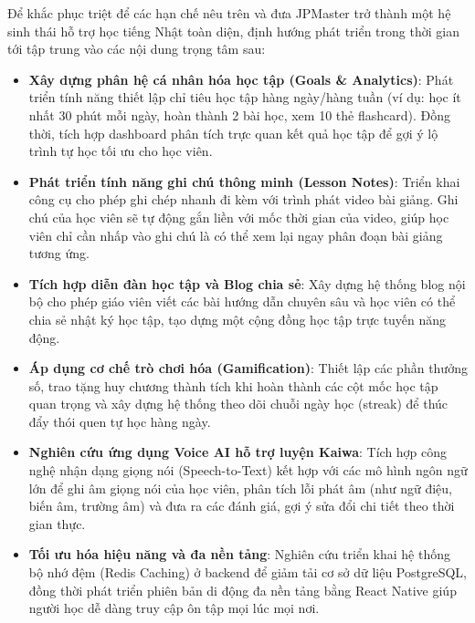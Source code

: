\documentclass[../DoAn.tex]{subfiles}
\begin{document}
Để khắc phục triệt để các hạn chế nêu trên và đưa JPMaster trở thành một hệ sinh thái hỗ trợ học tiếng Nhật toàn diện, định hướng phát triển trong thời gian tới tập trung vào các nội dung trọng tâm sau:
\begin{itemize}
    \item \textbf{Xây dựng phân hệ cá nhân hóa học tập (Goals \& Analytics)}: Phát triển tính năng thiết lập chỉ tiêu học tập hàng ngày/hàng tuần (ví dụ: học ít nhất 30 phút mỗi ngày, hoàn thành 2 bài học, xem 10 thẻ flashcard). Đồng thời, tích hợp dashboard phân tích trực quan kết quả học tập để gợi ý lộ trình tự học tối ưu cho học viên.
    \item \textbf{Phát triển tính năng ghi chú thông minh (Lesson Notes)}: Triển khai công cụ cho phép ghi chép nhanh đi kèm với trình phát video bài giảng. Ghi chú của học viên sẽ tự động gắn liền với mốc thời gian của video, giúp học viên chỉ cần nhấp vào ghi chú là có thể xem lại ngay phân đoạn bài giảng tương ứng.
    \item \textbf{Tích hợp diễn đàn học tập và Blog chia sẻ}: Xây dựng hệ thống blog nội bộ cho phép giáo viên viết các bài hướng dẫn chuyên sâu và học viên có thể chia sẻ nhật ký học tập, tạo dựng một cộng đồng học tập trực tuyến năng động.
    \item \textbf{Áp dụng cơ chế trò chơi hóa (Gamification)}: Thiết lập các phần thưởng số, trao tặng huy chương thành tích khi hoàn thành các cột mốc học tập quan trọng và xây dựng hệ thống theo dõi chuỗi ngày học (streak) để thúc đẩy thói quen tự học hàng ngày.
    \item \textbf{Nghiên cứu ứng dụng Voice AI hỗ trợ luyện Kaiwa}: Tích hợp công nghệ nhận dạng giọng nói (Speech-to-Text) kết hợp với các mô hình ngôn ngữ lớn để ghi âm giọng nói của học viên, phân tích lỗi phát âm (như ngữ điệu, biến âm, trường âm) và đưa ra các đánh giá, gợi ý sửa đổi chi tiết theo thời gian thực.
    \item \textbf{Tối ưu hóa hiệu năng và đa nền tảng}: Nghiên cứu triển khai hệ thống bộ nhớ đệm (Redis Caching) ở backend để giảm tải cơ sở dữ liệu PostgreSQL, đồng thời phát triển phiên bản di động đa nền tảng bằng React Native giúp người học dễ dàng truy cập ôn tập mọi lúc mọi nơi.
\end{itemize}
\end{document}
